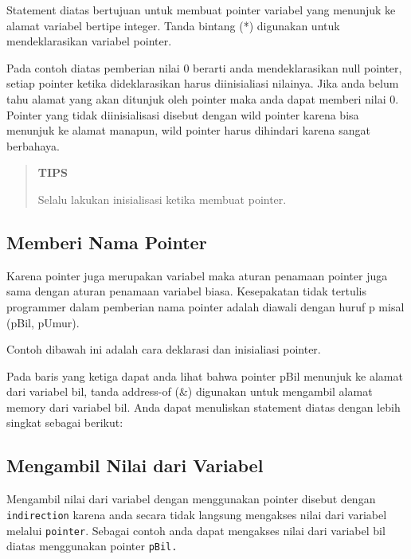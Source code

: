 

Statement diatas bertujuan untuk membuat pointer variabel yang menunjuk
ke alamat variabel bertipe integer. Tanda bintang (*) digunakan untuk
mendeklarasikan variabel pointer.

Pada contoh diatas pemberian nilai 0 berarti anda mendeklarasikan null
pointer, setiap pointer ketika dideklarasikan harus diinisialiasi
nilainya. Jika anda belum tahu alamat yang akan ditunjuk oleh pointer
maka anda dapat memberi nilai 0. Pointer yang tidak diinisialisasi
disebut dengan wild pointer karena bisa menunjuk ke alamat manapun, wild
pointer harus dihindari karena sangat berbahaya.

\begin{quotation}
{\LARGE {}}  \textbf{TIPS} 
	 
	 Selalu lakukan inisialisasi ketika membuat pointer.
\end{quotation}


\subsection{Memberi Nama Pointer}\label{memberi-nama-pointer}

Karena pointer juga merupakan variabel maka aturan penamaan pointer juga
sama dengan aturan penamaan variabel biasa. Kesepakatan tidak tertulis
programmer dalam pemberian nama pointer adalah diawali dengan huruf p
misal (pBil, pUmur).

Contoh dibawah ini adalah cara deklarasi dan inisialiasi pointer.



Pada baris yang ketiga dapat anda lihat bahwa pointer pBil menunjuk ke
alamat dari variabel bil, tanda address-of (\&) digunakan untuk
mengambil alamat memory dari variabel bil. Anda dapat menuliskan
statement diatas dengan lebih singkat sebagai berikut:



\subsection{Mengambil Nilai dari
Variabel}\label{mengambil-nilai-dari-variabel}

Mengambil nilai dari variabel dengan menggunakan pointer disebut dengan
\texttt{indirection} karena anda secara tidak langsung mengakses nilai
dari variabel melalui \texttt{pointer}. Sebagai contoh anda dapat
mengakses nilai dari variabel bil diatas menggunakan pointer
\texttt{pBil.}

